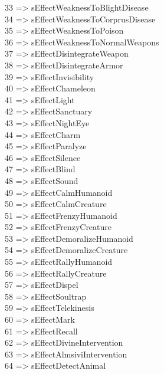 \documentclass[
]{article}
\begin{document}
33 =\textgreater{} sEffectWeaknessToBlightDisease\\
34 =\textgreater{} sEffectWeaknessToCorprusDisease\\
35 =\textgreater{} sEffectWeaknessToPoison\\
36 =\textgreater{} sEffectWeaknessToNormalWeapons\\
37 =\textgreater{} sEffectDisintegrateWeapon\\
38 =\textgreater{} sEffectDisintegrateArmor\\
39 =\textgreater{} sEffectInvisibility\\
40 =\textgreater{} sEffectChameleon\\
41 =\textgreater{} sEffectLight\\
42 =\textgreater{} sEffectSanctuary\\
43 =\textgreater{} sEffectNightEye\\
44 =\textgreater{} sEffectCharm\\
45 =\textgreater{} sEffectParalyze\\
46 =\textgreater{} sEffectSilence\\
47 =\textgreater{} sEffectBlind\\
48 =\textgreater{} sEffectSound\\
49 =\textgreater{} sEffectCalmHumanoid\\
50 =\textgreater{} sEffectCalmCreature\\
51 =\textgreater{} sEffectFrenzyHumanoid\\
52 =\textgreater{} sEffectFrenzyCreature\\
53 =\textgreater{} sEffectDemoralizeHumanoid\\
54 =\textgreater{} sEffectDemoralizeCreature\\
55 =\textgreater{} sEffectRallyHumanoid\\
56 =\textgreater{} sEffectRallyCreature\\
57 =\textgreater{} sEffectDispel\\
58 =\textgreater{} sEffectSoultrap\\
59 =\textgreater{} sEffectTelekinesis\\
60 =\textgreater{} sEffectMark\\
61 =\textgreater{} sEffectRecall\\
62 =\textgreater{} sEffectDivineIntervention\\
63 =\textgreater{} sEffectAlmsiviIntervention\\
64 =\textgreater{} sEffectDetectAnimal\\
\end{document}
